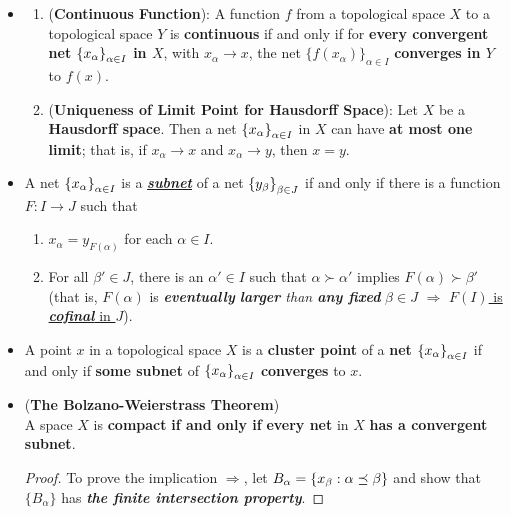 \documentclass[11pt]{article}
\begin{document}
\begin{itemize}
\item \begin{proposition} \citep{munkres2000topology}
\begin{enumerate}
\item (\textbf{Continuous Function}): A function $f$ from a topological space $X$ to a topological space $Y$ is \textbf{continuous} if and only if for \textbf{every convergent net} $\left\{x_\alpha\right\}_{\alpha \in I}$ \textbf{in $X$}, with $x_{\alpha} \rightarrow x$, the net $\{f(x_{\alpha})\}_{\alpha \in I}$ \textbf{converges in $Y$} to $f(x)$.
\item (\textbf{Uniqueness of Limit Point for Hausdorff Space}): Let $X$ be a \textbf{Hausdorff space}. Then a net $\left\{x_\alpha\right\}_{\alpha \in I}$ in $X$ can have \textbf{at most one limit}; that is, if $x_{\alpha} \rightarrow x$ and $x_{\alpha} \rightarrow y$, then $x = y$.
\end{enumerate}
\end{proposition}

\item \begin{definition}
A net  $\left\{x_\alpha\right\}_{\alpha \in I}$ is a \underline{\emph{\textbf{subnet}}} of a net  $\left\{y_\beta\right\}_{\beta \in J}$ if and only if there is
a function $F: I \rightarrow J$ such that
\begin{enumerate}
\item $x_\alpha = y_{F(\alpha)}$ for each $\alpha \in I$.
\item For all $\beta' \in J$, there is an $\alpha' \in I$ such that $\alpha \succ \alpha'$ implies $F(\alpha) \succ \beta'$ (that is,
$F(\alpha)$ is \emph{\textbf{eventually} \textbf{larger} than \textbf{any fixed}} $\beta \in J$ $\Rightarrow$ \underline{$F(I)$ is \textbf{\emph{cofinal}} in $J$}).
\end{enumerate}
\end{definition}

\item \begin{proposition}
A point $x$ in a topological space $X$ is a \textbf{cluster point} of a \textbf{net} $\left\{x_\alpha\right\}_{\alpha \in I}$ if and only if \textbf{some subnet} of $\left\{x_\alpha\right\}_{\alpha \in I}$ \textbf{converges} to $x$.
\end{proposition}

\item \begin{theorem} (\textbf{The Bolzano-Weierstrass Theorem}) \citep{reed1980methods, munkres2000topology} \\
A space $X$ is \textbf{compact} \textbf{if and only if} \textbf{every net} in $X$ \textbf{has a convergent subnet}.
\end{theorem}
\begin{proof}To prove the implication $\Rightarrow$, let $B_{\alpha} = \left\{x_{\beta}: \alpha \preceq \beta\right\}$ and show that
$\{B_{\alpha}\}$ has \emph{\textbf{the finite intersection property}}. 


\end{proof}
\end{itemize}
\end{document}
